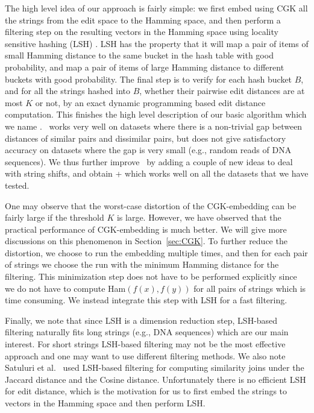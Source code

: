 The high level idea of our approach is fairly simple: we first embed using CGK all the strings from the edit space to the Hamming space, and then perform a filtering step on the resulting vectors in the Hamming space using locality sensitive hashing (LSH) \cite{IM98,GIM99}.  LSH has the property that it will map a pair of items of small Hamming distance to the same bucket in the hash table with good probability, and map a pair of items of large Hamming distance to different buckets with good probability.  The final step is to verify for each hash bucket $B$, and for all the strings hashed into $B$, whether their pairwise edit distances are at most $K$ or not, by an exact dynamic programming based edit distance computation.  This finishes the high level description of our basic algorithm which we name \ebdjoin. \ebdjoin\ works very well on datasets where there is a non-trivial gap between distances of similar pairs and dissimilar pairs, but does not give satisfactory accuracy on datasets where the gap is very small (e.g., random reads of DNA sequences).  We thus further improve \ebdjoin\  by adding a couple of new ideas to deal with string shifts, and obtain \ebdjoin+ which works well on all the datasets that we have tested.
  
One may observe that the worst-case distortion of the CGK-embedding can be fairly large if the threshold $K$ is large. However, we have observed that the practical performance of CGK-embedding is much better. We will give more discussions on this phenomenon in Section~\ref{sec:CGK}.   To further reduce the distortion, we choose to run the embedding multiple times, and then for each pair of strings we choose the run with the minimum Hamming distance for the filtering.  This minimization step does not have to be performed explicitly since we do not have to compute Ham$(f(x), f(y))$ for all pairs of strings which is time consuming. We instead integrate this step with LSH for a fast filtering.  

Finally, we note that since LSH is a dimension reduction step, LSH-based filtering naturally fits long strings  (e.g., DNA sequences) which are our main interest.  For short strings LSH-based filtering may not be the most effective approach and one may want to use different filtering methods.  We also note Satuluri et al.~\cite{SP12} used LSH-based filtering for computing similarity joins under the Jaccard distance and the Cosine distance.   Unfortunately there is no efficient LSH for edit distance, which is the motivation for us to first embed the strings to vectors in the Hamming space and then perform LSH.  

